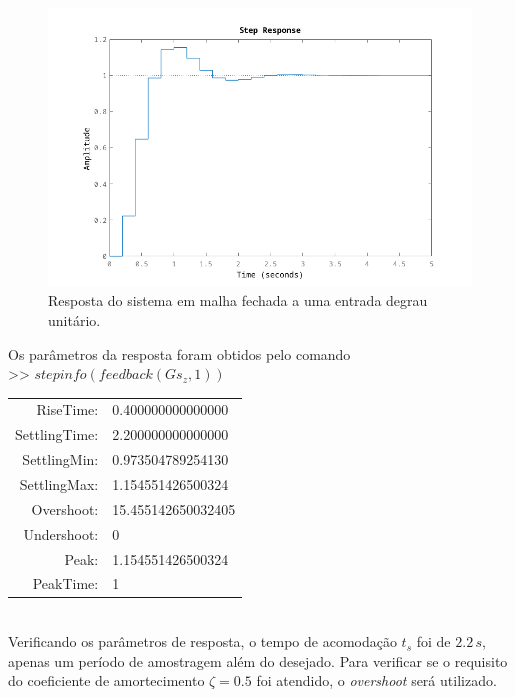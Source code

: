 \documentclass{article}
\begin{document}
{{        \begin{figure}[H]
           \centering
                \includegraphics[width=1\linewidth]{images/q2_step_response.png}
                \caption{Resposta do sistema em malha fechada a uma entrada degrau unitário.}
                \label{fig:q2_step_response}
        \end{figure}

        {Os parâmetros da resposta foram obtidos pelo comando}\\
        >> $ stepinfo(feedback(Gs_z, 1)) $\\
        \begin{tabular}{ r l }
            RiseTime: & 0.400000000000000\\
            SettlingTime: & 2.200000000000000\\
            SettlingMin: & 0.973504789254130\\
            SettlingMax: & 1.154551426500324\\
            Overshoot: & 15.455142650032405\\
            Undershoot: & 0\\
            Peak: & 1.154551426500324\\
            PeakTime: & 1\\
        \end{tabular}\\

        {Verificando os parâmetros de resposta, o tempo de acomodação $t_s$ foi
            de $2.2\,s$, apenas um período de amostragem além do desejado.}
        {Para verificar se o requisito do coeficiente de amortecimento
            $\zeta = 0.5$ foi atendido, o \textit{overshoot} será utilizado.}

}}
\end{document}
